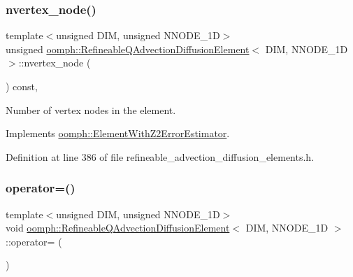 \subsubsection{\texorpdfstring{nvertex\+\_\+node()}{nvertex\_node()}}
{\footnotesize\ttfamily template$<$unsigned D\+IM, unsigned N\+N\+O\+D\+E\+\_\+1D$>$ \\
unsigned \hyperlink{classoomph_1_1RefineableQAdvectionDiffusionElement}{oomph\+::\+Refineable\+Q\+Advection\+Diffusion\+Element}$<$ D\+IM, N\+N\+O\+D\+E\+\_\+1D $>$\+::nvertex\+\_\+node (\begin{DoxyParamCaption}{ }\end{DoxyParamCaption}) const\hspace{0.3cm}{\ttfamily [inline]}, {\ttfamily [virtual]}}



Number of vertex nodes in the element. 



Implements \hyperlink{classoomph_1_1ElementWithZ2ErrorEstimator_a19495a0e77ef4ff35f15fdf7913b4077}{oomph\+::\+Element\+With\+Z2\+Error\+Estimator}.



Definition at line 386 of file refineable\+\_\+advection\+\_\+diffusion\+\_\+elements.\+h.

\mbox{\label{classoomph_1_1RefineableQAdvectionDiffusionElement_a8330801fec59403883217246cac3e55e}} 
\subsubsection{\texorpdfstring{operator=()}{operator=()}}
{\footnotesize\ttfamily template$<$unsigned D\+IM, unsigned N\+N\+O\+D\+E\+\_\+1D$>$ \\
void \hyperlink{classoomph_1_1RefineableQAdvectionDiffusionElement}{oomph\+::\+Refineable\+Q\+Advection\+Diffusion\+Element}$<$ D\+IM, N\+N\+O\+D\+E\+\_\+1D $>$\+::operator= (\begin{DoxyParamCaption}\item[{const \hyperlink{classoomph_1_1RefineableQAdvectionDiffusionElement}{Refineable\+Q\+Advection\+Diffusion\+Element}$<$ D\+IM, N\+N\+O\+D\+E\+\_\+1D $>$ \&}]{ }\end{DoxyParamCaption})\hspace{0.3cm}{\ttfamily [inline]}}



